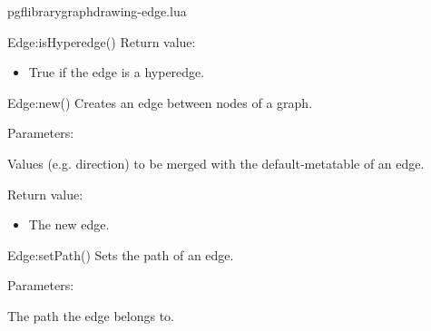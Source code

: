 \begin{filedescription}{pgflibrarygraphdrawing-edge.lua}
\begin{luacommand}{{Edge:isHyperedge}()}
Return value:
\begin{itemize} \item[] True if the edge is a hyperedge. \end{itemize}


\end{luacommand}\begin{luacommand}{{Edge:new}()}
Creates an edge between nodes of a graph.

Parameters:
\begin{parameterdescription}
	\item[\meta{values}] Values (e.g. direction) to be merged with the default-metatable of an edge.
\end{parameterdescription}


Return value:
\begin{itemize} \item[] The new edge. \end{itemize}


\end{luacommand}\begin{luacommand}{{Edge:setPath}()}
Sets the path of an edge.

Parameters:
\begin{parameterdescription}
	\item[\meta{path}] The path the edge belongs to.
\end{parameterdescription}



\end{luacommand}
\end{filedescription}
